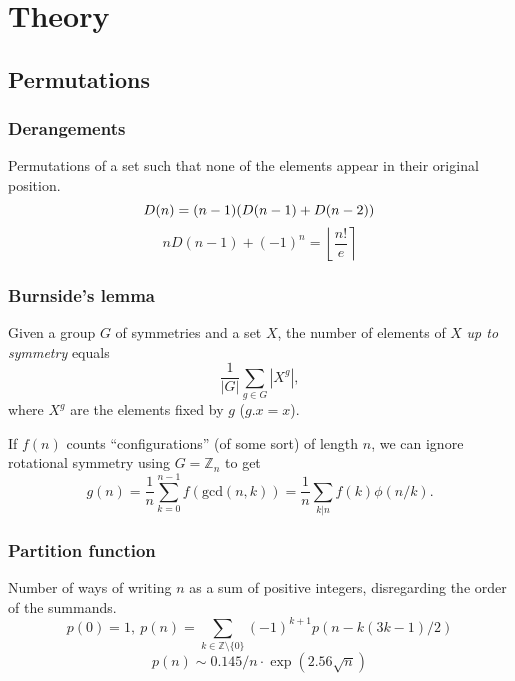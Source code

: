 \chapter{Theory}
\section{Permutations}
		


	\subsection{Derangements}
		Permutations of a set such that none of the elements appear in their original position.
		\[ \mkern-2mu D(n) = (n-1)(D(n-1)+D(n-2)) \]
		\[n D(n-1)+(-1)^n = \left\lfloor\frac{n!}{e}\right\rceil \]

	\subsection{Burnside's lemma}
		Given a group $G$ of symmetries and a set $X$, the number of elements of $X$ \emph{up to symmetry} equals
		 \[ {\frac {1}{|G|}}\sum _{{g\in G}}|X^{g}|, \]
		 where $X^{g}$ are the elements fixed by $g$ ($g.x = x$).

		 If $f(n)$ counts ``configurations'' (of some sort) of length $n$, we can ignore rotational symmetry using $G = \mathbb Z_n$ to get
		 \[ g(n) = \frac 1 n \sum_{k=0}^{n-1}{f(\text{gcd}(n, k))} = \frac 1 n \sum_{k|n}{f(k)\phi(n/k)}. \]

	\subsection{Partition function}
		Number of ways of writing $n$ as a sum of positive integers, disregarding the order of the summands.
		\[ p(0) = 1,\ p(n) = \sum_{k \in \mathbb Z \setminus \{0\}}{(-1)^{k+1} p(n - k(3k-1) / 2)} \]
		\[ p(n) \sim 0.145 / n \cdot \exp(2.56 \sqrt{n}) \]

